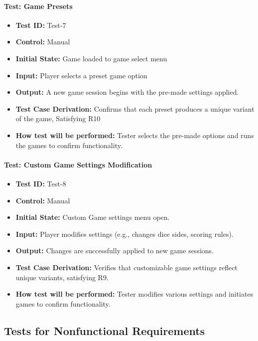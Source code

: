 \documentclass[12pt, titlepage]{article}
\begin{document}
\paragraph{Test: Game Presets}
\begin{itemize}
    \item \textbf{Test ID:} Test-7
    \item \textbf{Control:} Manual
    \item \textbf{Initial State:} Game loaded to game select menu
    \item \textbf{Input:} Player selects a preset game option
    \item \textbf{Output:} A new game session begins with the pre-made settings applied.
    \item \textbf{Test Case Derivation:} Confirms that each preset produces a unique variant of the game, Satisfying R10
    \item \textbf{How test will be performed:} Tester selects the pre-made options and runs the games to confirm functionality.
\end{itemize}

\paragraph{Test: Custom Game Settings Modification}
\begin{itemize}
    \item \textbf{Test ID:} Test-8
    \item \textbf{Control:} Manual
    \item \textbf{Initial State:} Custom Game settings menu open.
    \item \textbf{Input:} Player modifies settings (e.g., changes dice sides, scoring rules).
    \item \textbf{Output:} Changes are successfully applied to new game sessions.
    \item \textbf{Test Case Derivation:} Verifies that customizable game settings reflect unique variants, satisfying R9.
    \item \textbf{How test will be performed:} Tester modifies various settings and initiates games to confirm functionality.
\end{itemize}

\subsection{Tests for Nonfunctional Requirements}
\end{document}
